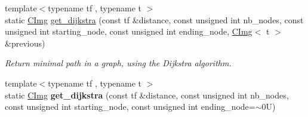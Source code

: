 \begin{DoxyCompactItemize}
\item 
{\footnotesize template$<$typename tf , typename t $>$ }\\static \hyperlink{structcimg__library_1_1_c_img}{C\-Img} \hyperlink{structcimg__library_1_1_c_img_a0232d8fbf4a5f2cc70c6b52fdb4fe6cf}{get\-\_\-dijkstra} (const tf \&distance, const unsigned int nb\-\_\-nodes, const unsigned int starting\-\_\-node, const unsigned int ending\-\_\-node, \hyperlink{structcimg__library_1_1_c_img}{C\-Img}$<$ t $>$ \&previous)
\begin{DoxyCompactList}\small\item\em Return minimal path in a graph, using the Dijkstra algorithm. \end{DoxyCompactList}\item 
\hypertarget{structcimg__library_1_1_c_img_a14a58806d224725b982c6e6abe04a0a3}{{\footnotesize template$<$typename tf , typename t $>$ }\\static \hyperlink{structcimg__library_1_1_c_img}{C\-Img} {\bfseries get\-\_\-dijkstra} (const tf \&distance, const unsigned int nb\-\_\-nodes, const unsigned int starting\-\_\-node, const unsigned int ending\-\_\-node=$\sim$0\-U)}\label{structcimg__library_1_1_c_img_a14a58806d224725b982c6e6abe04a0a3}

\end{DoxyCompactItemize}
